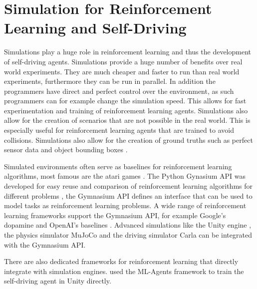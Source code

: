 \section{Simulation for Reinforcement Learning and Self-Driving}


Simulations play a huge role in reinforcement learning and thus the development of self-driving agents. Simulations provide a huge number of benefits over real world experiments. They are much cheaper and faster to run than real world experiments, furthermore they can be run in parallel. In addition the programmers have direct and perfect control over the environment, as such programmers can for example change the simulation speed. This allows for fast experimentation and training of reinforcement learning agents. Simulations also allow for the creation of scenarios that are not possible in the real world. This is especially useful for reinforcement learning agents that are trained to avoid collisions. Simulations also allow for the creation of ground truths such as perfect sensor data and object bounding boxes \textcite{carla}.

Simulated environments often serve as baselines for reinforcement learning algorithms, most famous are the atari games \textcite{atari}. The Python Gynasium API was developed for easy reuse and comparison of reinforcement learning algorithms for different problems \textcite{gymnasium}, the Gymnasium API defines an interface that can be used to model tasks as reinforcement learning problems. A wide range of reinforcement learning frameworks support the Gymnasium API, for example Google's dopamine \textcite{dopamine} and OpenAI's baselines \textcite{sb3}. Advanced simulations like the Unity engine \textcite{unity}, the physics simulator MuJoCo \textcite{mujoco} and the driving simulator Carla \textcite{carla} can be integrated with the Gymnasium API.


There are also dedicated frameworks for reinforcement learning that directly integrate with simulation engines. \textcite{maximilian} used the ML-Agents framework \textcite{mlagents} to train the self-driving agent in Unity directly.

